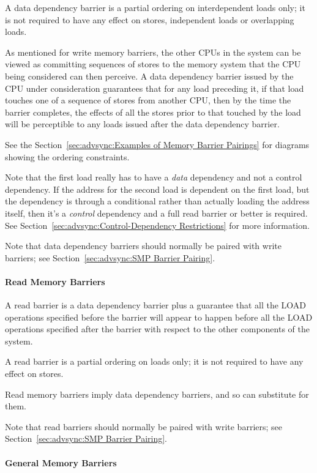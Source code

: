 A data dependency barrier is a partial ordering on interdependent loads
only; it is not required to have any effect on stores, independent loads
or overlapping loads.

As mentioned for write memory barriers,
the other CPUs in the system can be viewed as
committing sequences of stores to the memory system that the CPU being
considered can then perceive.  A data dependency barrier issued by the CPU
under consideration guarantees that for any load preceding it, if that
load touches one of a sequence of stores from another CPU, then by the
time the barrier completes, the effects of all the stores prior to that
touched by the load will be perceptible to any loads issued after the data
dependency barrier.

See the Section~\ref{sec:advsync:Examples of Memory Barrier Pairings} for
diagrams showing the ordering constraints.

Note that the first load really has to have a
\emph{data} dependency and
not a control dependency.  If the address for the second load is dependent
on the first load, but the dependency is through a conditional rather than
actually loading the address itself, then it's a \emph{control} dependency and
a full read barrier or better is required.  See
Section~\ref{sec:advsync:Control-Dependency Restrictions} for more information.

Note that data dependency barriers should normally be paired with
write barriers; see Section~\ref{sec:advsync:SMP Barrier Pairing}.

\paragraph{Read Memory Barriers}

A read barrier is a data dependency barrier plus a guarantee that all the
LOAD operations specified before the barrier will appear to happen before
all the LOAD operations specified after the barrier with respect to the
other components of the system.

A read barrier is a partial ordering on loads only; it is not required to
have any effect on stores.

Read memory barriers imply data dependency barriers, and so can substitute
for them.

Note that read barriers should normally be paired with write barriers;
see Section~\ref{sec:advsync:SMP Barrier Pairing}.

\paragraph{General Memory Barriers}

